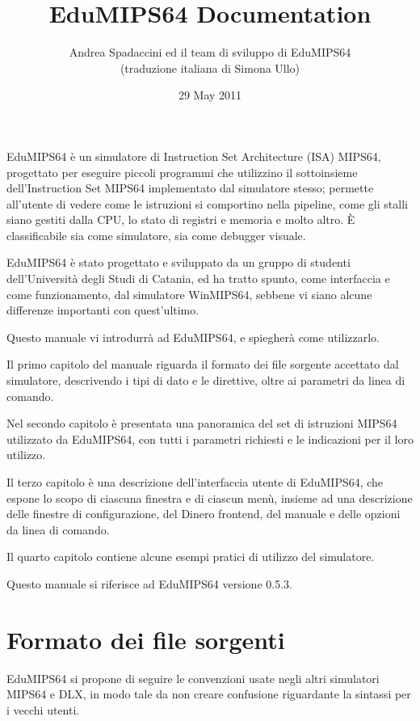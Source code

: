 \documentclass[letterpaper,10pt,italian]{sphinxmanual}
\title{EduMIPS64 Documentation}
\date{29 May 2011}
\author{Andrea Spadaccini ed il team di sviluppo di EduMIPS64\\(traduzione italiana di Simona Ullo)}
\begin{document}
\maketitle
\tableofcontents
{}\label{index::doc}


EduMIPS64 è un simulatore di Instruction Set Architecture (ISA) MIPS64,
progettato per eseguire piccoli programmi che utilizzino il sottoinsieme
dell'Instruction Set MIPS64 implementato dal simulatore stesso; permette
all'utente di vedere come le istruzioni si comportino nella pipeline, come gli
stalli siano gestiti dalla CPU, lo stato di registri e memoria e molto altro.
È classificabile sia come simulatore, sia come debugger visuale.

EduMIPS64 è stato progettato e sviluppato da un gruppo di studenti
dell'Università degli Studi di Catania, ed ha tratto spunto, come interfaccia
e come funzionamento, dal simulatore WinMIPS64, sebbene vi siano alcune
differenze importanti con quest'ultimo.

Questo manuale vi introdurrà ad EduMIPS64, e spiegherà come utilizzarlo.

Il primo capitolo del manuale riguarda il formato dei file sorgente accettato
dal simulatore, descrivendo i tipi di dato e le direttive, oltre ai parametri da
linea di comando.

Nel secondo capitolo è presentata una panoramica del set di istruzioni
MIPS64 utilizzato da EduMIPS64, con tutti i parametri richiesti e le indicazioni per
il loro utilizzo.

Il terzo capitolo è una descrizione dell'interfaccia utente di EduMIPS64, che
espone lo scopo di ciascuna finestra e di ciascun menù, insieme ad una
descrizione delle finestre di configurazione, del Dinero frontend, del manuale e
delle opzioni da linea di comando.

Il quarto capitolo contiene alcune esempi pratici di utilizzo del simulatore.

Questo manuale si riferisce ad EduMIPS64 versione 0.5.3.


\chapter{Formato dei file sorgenti}
\label{source-files-format:benvenuti-nella-documentazione-di-edumips64}\label{source-files-format:formato-dei-file-sorgenti}\label{source-files-format::doc}
EduMIPS64 si propone di seguire le convenzioni usate negli altri simulatori
MIPS64 e DLX, in modo tale da non creare confusione riguardante la sintassi
per i vecchi utenti.
\end{document}
